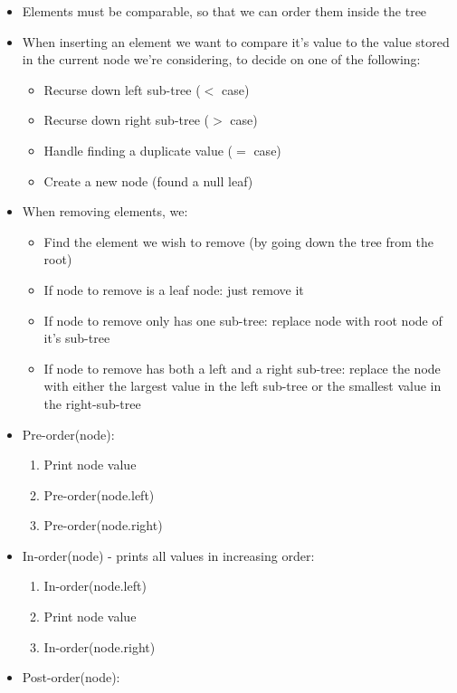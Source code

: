 \documentclass{article}
\begin{document}
\begin{itemize}
    \item Elements must be comparable, so that we can order them inside the tree
    \item When inserting an element we want to compare it's value to the value stored in the current node we're considering, to decide on one of the following:
    \begin{itemize}
        \item Recurse down left sub-tree ($<$ case)
        \item Recurse down right sub-tree ($>$ case)
        \item Handle finding a duplicate value ($=$ case)
        \item Create a new node (found a null leaf)
    \end{itemize}
    \item When removing elements, we:
    \begin{itemize}
        \item Find the element we wish to remove (by going down the tree from the root)
        \item If node to remove is a leaf node: just remove it
        \item If node to remove only has one sub-tree: replace node with root node of it's sub-tree
        \item If node to remove has both a left and a right sub-tree: replace the node with either the largest value in the left sub-tree or the smallest value in the right-sub-tree
    \end{itemize}
    \item Pre-order(node):
    \begin{enumerate}
        \item Print node value
        \item Pre-order(node.left)
        \item Pre-order(node.right)
    \end{enumerate}
    \item In-order(node) - prints all values in increasing order:
    \begin{enumerate}
        \item In-order(node.left)
        \item Print node value
        \item In-order(node.right)
    \end{enumerate}
    \item Post-order(node):
    \begin{enumerate}

\end{enumerate}
\end{itemize}
\end{document}
